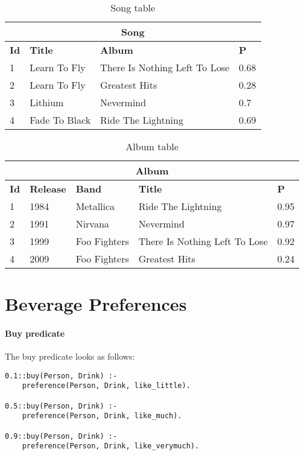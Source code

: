 \documentclass{article}
\begin{document}
\begin{table}[]
\centering

\begin{tabular}{llll}
\multicolumn{4}{c}{\textbf{Song}}                                         \\ \hline
\textbf{Id} & \textbf{Title} & \textbf{Album}                & \textbf{P} \\
1           & Learn To Fly   & There Is Nothing Left To Lose & 0.68       \\
2           & Learn To Fly   & Greatest Hits                 & 0.28       \\
3           & Lithium        & Nevermind                     & 0.7        \\
4           & Fade To Black  & Ride The Lightning                              & 0.69       \\ \hline
\end{tabular}
\caption{Song table}
\label{song}
\end{table}
\begin{table}[]
\centering


\begin{tabular}{lllll}
\multicolumn{5}{c}{\textbf{Album}}                                                          \\ \hline
\textbf{Id} & \textbf{Release} & \textbf{Band} & \textbf{Title}                & \textbf{P} \\
1           & 1984             & Metallica     & Ride The Lightning            & 0.95       \\
2           & 1991             & Nirvana       & Nevermind                     & 0.97       \\
3           & 1999             & Foo Fighters  & There Is Nothing Left To Lose & 0.92       \\
4           & 2009             & Foo Fighters  & Greatest Hits                 & 0.24       \\ \hline
\end{tabular}
\caption{Album table}
\label{album}
\end{table}




\section{Beverage Preferences}
\paragraph{Buy predicate}
The buy predicate looks as follows: 
\begin{verbatim}
0.1::buy(Person, Drink) :-
	preference(Person, Drink, like_little).

0.5::buy(Person, Drink) :-
	preference(Person, Drink, like_much).

0.9::buy(Person, Drink) :-
	preference(Person, Drink, like_verymuch).
\end{verbatim}
\end{document}
